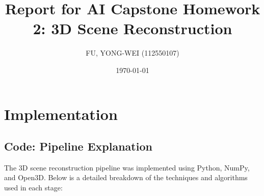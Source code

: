 \documentclass{article}
\title{Report for AI Capstone Homework 2: 3D Scene Reconstruction}
\author{FU, YONG-WEI (112550107)}
\date{\today}
\begin{document}
\sloppy

\maketitle

\section{Implementation}

\subsection{Code: Pipeline Explanation}
The 3D scene reconstruction pipeline was implemented using Python, NumPy, and Open3D. 
Below is a detailed breakdown of the techniques and algorithms used in each stage:
\end{document}
